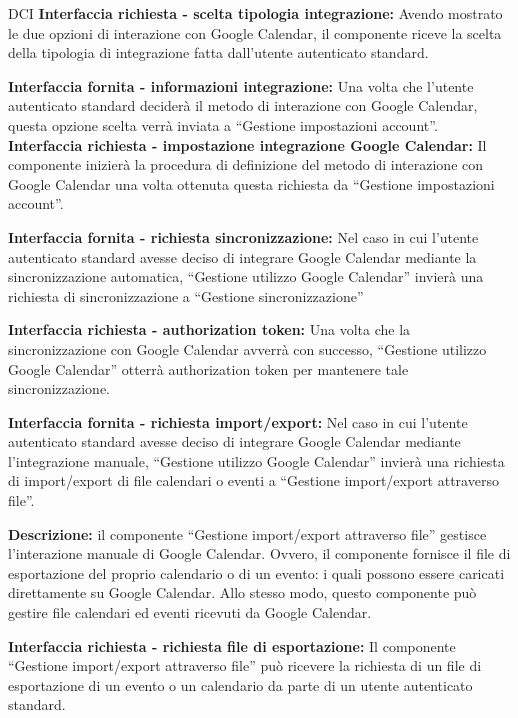 \begin{listaPersonale}{DCI}
    \textbf{Interfaccia richiesta - scelta tipologia integrazione:} Avendo mostrato le due opzioni di interazione con Google Calendar, il componente riceve la scelta della tipologia di integrazione fatta dall'utente autenticato standard.

    \textbf{Interfaccia fornita - informazioni integrazione:} Una volta che l'utente autenticato standard deciderà il metodo di interazione con Google Calendar, questa opzione scelta verrà inviata a “Gestione impostazioni account”.
    \textbf{Interfaccia richiesta - impostazione integrazione Google
        Calendar:} Il componente inizierà la procedura di definizione del metodo di interazione con Google Calendar una volta ottenuta questa richiesta da “Gestione impostazioni account”.

    \textbf{Interfaccia fornita - richiesta sincronizzazione:} Nel caso in cui l'utente autenticato standard avesse deciso di integrare Google Calendar mediante la sincronizzazione automatica, “Gestione utilizzo Google Calendar” invierà una richiesta di sincronizzazione a “Gestione sincronizzazione”

    \textbf{Interfaccia richiesta - authorization token:} Una volta che la sincronizzazione con Google Calendar avverrà con successo, “Gestione utilizzo Google Calendar” otterrà authorization token per mantenere tale sincronizzazione.

    \textbf{Interfaccia fornita - richiesta import/export:}  Nel caso in cui l'utente autenticato standard avesse deciso di integrare Google Calendar mediante l'integrazione manuale, “Gestione utilizzo Google Calendar” invierà una richiesta di import/export di file calendari o eventi a “Gestione import/export attraverso file”.



    \textbf{Descrizione:} il componente “Gestione import/export attraverso file” gestisce l'interazione manuale di Google Calendar. Ovvero, il componente fornisce il file di esportazione del proprio calendario o di un evento: i quali possono essere caricati direttamente su Google Calendar. Allo stesso modo, questo componente può gestire file calendari ed eventi ricevuti da Google Calendar.

    \textbf{Interfaccia richiesta - richiesta file di esportazione:} Il componente “Gestione import/export attraverso file” può ricevere la richiesta di un file di esportazione di un evento o un calendario da parte di un utente autenticato standard.


\end{listaPersonale}
